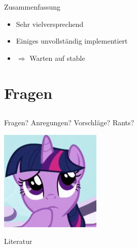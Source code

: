 \documentclass[notes=hide,yellow]{beamer}
\begin{document}
\begin{frame}{Zusammenfassung}
\begin{itemize}
	\item Sehr vielversprechend
	\item Einiges unvollst\"andig implementiert 
	\item $\Rightarrow$ Warten auf stable
\end{itemize}
\end{frame}

\section{Fragen}
\subsection*{}
\begin{frame}
	\begin{center}
	\large Fragen? Anregungen? Vorschl\"age? Rants?
	\end{center}
	
	\begin{center}
	\includegraphics[scale=0.8]{questions.jpg}
	\end{center}
\end{frame}



\begin{frame}{Literatur}
	
		
\end{frame}
\end{document}
